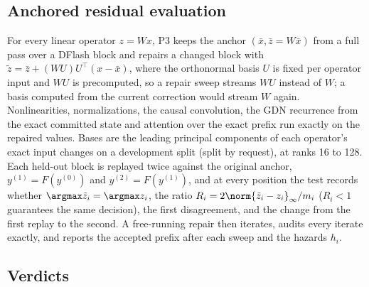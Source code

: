 
\subsection{Anchored residual evaluation}\label{sec:repair-residual}
For every linear operator $z=Wx$, P3 keeps the anchor $(\bar x,\bar z=W\bar x)$ from a full pass over a DFlash block and repairs a changed block with $\tilde z=\bar z+(WU)U^\top(x-\bar x)$, where the orthonormal basis $U$ is fixed per operator input and $WU$ is precomputed, so a repair sweep streams $WU$ instead of $W$; a basis computed from the current correction would stream $W$ again. Nonlinearities, normalizations, the causal convolution, the GDN recurrence from the exact committed state and attention over the exact prefix run exactly on the repaired values. Bases are the leading principal components of each operator's exact input changes on a development split (split by request), at ranks 16 to 128. Each held-out block is replayed twice against the original anchor, $y^{(1)}=F(y^{(0)})$ and $y^{(2)}=F(y^{(1)})$, and at every position the test records whether $\argmax\tilde z_i=\argmax z_i$, the ratio $R_i=2\norm{\tilde z_i-z_i}_\infty/m_i$ ($R_i<1$ guarantees the same decision), the first disagreement, and the change from the first replay to the second. A free-running repair then iterates, audits every iterate exactly, and reports the accepted prefix after each sweep and the hazards $h_i$.


\subsection{Verdicts}\label{sec:repair-verdict}

